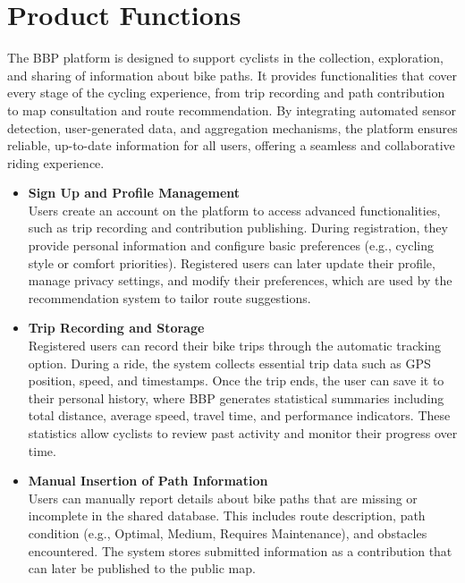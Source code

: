 \section{Product Functions}
\label{sec:product_functions}
The BBP platform is designed to support cyclists in the collection, exploration, and sharing of information about bike paths. It provides functionalities that cover every stage of the cycling experience, from trip recording and path contribution to map consultation and route recommendation. By integrating automated sensor detection, user-generated data, and aggregation mechanisms, the platform ensures reliable, up-to-date information for all users, offering a seamless and collaborative riding experience.
\begin{itemize}
    \item \textbf{Sign Up and Profile Management}\\
    Users create an account on the platform to access advanced functionalities, such as trip recording and contribution publishing. During registration, they provide personal information and configure basic preferences (e.g., cycling style or comfort priorities). Registered users can later update their profile, manage privacy settings, and modify their preferences, which are used by the recommendation system to tailor route suggestions.

   \item \textbf{Trip Recording and Storage}\\
Registered users can record their bike trips through the automatic tracking option. 
During a ride, the system collects essential trip data such as GPS position, speed, and timestamps. 
Once the trip ends, the user can save it to their personal history, where BBP generates statistical summaries including total distance, average speed, travel time, and performance indicators. 
These statistics allow cyclists to review past activity and monitor their progress over time.

    \item \textbf{Manual Insertion of Path Information}\\
    Users can manually report details about bike paths that are missing or incomplete in the shared database. This includes route description, path condition (e.g., Optimal, Medium, Requires Maintenance), and obstacles encountered. The system stores submitted information as a contribution that can later be published to the public map.


\end{itemize}

